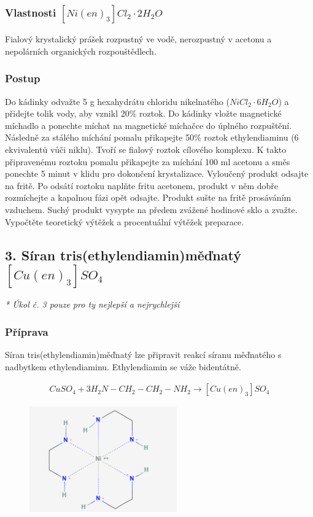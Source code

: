 \documentclass[13pt, a4paper, twoside]{article}
\begin{document}
\subsubsection*{Vlastnosti $[Ni(en)_3]Cl_2 \cdot 2H_2O$}
Fialový krystalický prášek rozpustný ve vodě, nerozpustný v acetonu a nepolárních organických rozpouštědlech.

\subsubsection*{Postup}
Do kádinky odvažte 5 g hexahydrátu chloridu nikelnatého ($NiCl_2 \cdot 6H_2O$) a přidejte tolik vody, aby vznikl 20\% roztok. Do kádinky vložte magnetické míchadlo
a ponechte míchat na magnetické míchačce do úplného rozpuštění. Následně za stálého míchání pomalu přikapejte 50\% roztok ethylendiaminu
(6 ekvivalentů vůči niklu). Tvoří se fialový roztok cílového komplexu. K takto připravenému roztoku pomalu přikapejte za míchání 100 ml acetonu a směs
ponechte 5 minut v klidu pro dokončení krystalizace. Vyloučený produkt odsajte na fritě. Po odsátí roztoku naplňte fritu acetonem, produkt v něm dobře 
rozmíchejte a kapalnou fázi opět odsajte. Produkt sušte na fritě prosáváním vzduchem. Suchý produkt vysypte na předem zvážené hodinové sklo a zvažte.
Vypočtěte teoretický výtěžek a procentuální výtěžek preparace.

\subsection*{3. Síran tris(ethylendiamin)měďnatý $[Cu(en)_3]SO_4$}
\Large \emph{* Úkol č. 3 pouze pro ty nejlepší a nejrychlejší}
\large
\subsubsection*{Příprava}
Síran tris(ethylendiamin)měďnatý lze připravit reakcí síranu měďnatého s nadbytkem ethylendiaminu. Ethylendiamin se váže bidentátně.

\begin{align*}
    CuSO_4 + 3H_2N-CH_2-CH_2-NH_2 \to [Cu(en)_3]SO_4
\end{align*}

\begin{figure}[H]
    \centering
    \includegraphics*[width=2.5in]{copper.png}
\end{figure}
\end{document}
